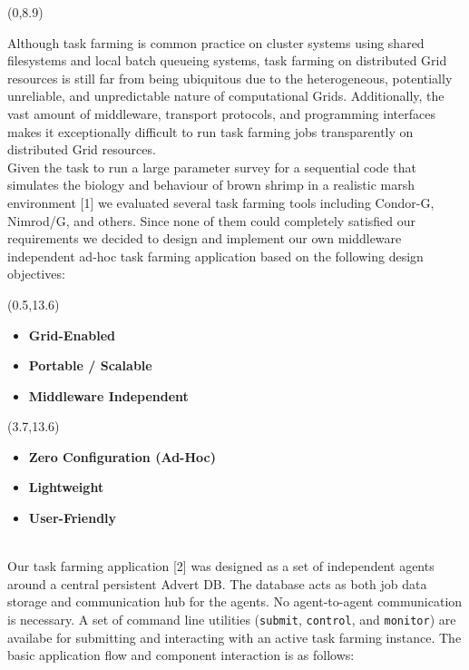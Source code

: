 \documentclass[a0b,portrait]{a0poster}
\def\LHead#1{\bigskip\bigskip\noindent{\huge\color{HeadColor} #1}\smallskip}
\begin{document}
\begin{textblock}{7}(0,8.9)
  \LHead{Introduction}
  
  \large 
Although task farming is common practice on cluster systems using shared 
filesystems and local batch queueing systems, task farming on distributed Grid 
resources is still far from being ubiquitous due to the heterogeneous, 
potentially unreliable, and unpredictable nature of computational Grids. 
Additionally, the vast amount of middleware, transport protocols, and 
programming interfaces makes it exceptionally difficult to run task farming jobs 
transparently on distributed Grid resources.\\[0.4em]
Given the task to run a large parameter survey for a sequential code that 
simulates the biology and behaviour of brown shrimp in a realistic marsh 
environment [1] we evaluated several task farming tools including Condor-G, 
Nimrod/G, and others. Since none of them could completely satisfied our 
requirements we decided to design and implement our own middleware independent 
ad-hoc task farming application based on the following design objectives:\\[3.6em]

\color{DarkBlue}
\begin{textblock}{3}(0.5,13.6)
  \color{DarkBlue}
  \begin{itemize}
    \item \textbf{Grid-Enabled} 
    \item \textbf{Portable / Scalable}
    \item \textbf{Middleware Independent}
  \end{itemize}
\end{textblock}

\begin{textblock}{7}(3.7,13.6)
  \color{DarkBlue}
  \begin{itemize}
    \item \textbf{Zero Configuration (Ad-Hoc)}
    \item \textbf{Lightweight}
    \item \textbf{User-Friendly}
  \end{itemize}
\end{textblock}
\color{Black}

\LHead{Implementation}\\[.4em]
Our task farming application [2] was designed as a set of independent agents 
around a central persistent Advert DB. The database acts as both job data storage
and communication hub for the agents. No agent-to-agent communication is 
necessary. A set of command line utilities (\texttt{submit}, \texttt{control}, 
and \texttt{monitor}) are availabe for submitting and interacting with an active 
task farming instance. The basic application flow and component interaction is 
as follows:\\ 


\end{textblock}
\end{document}
